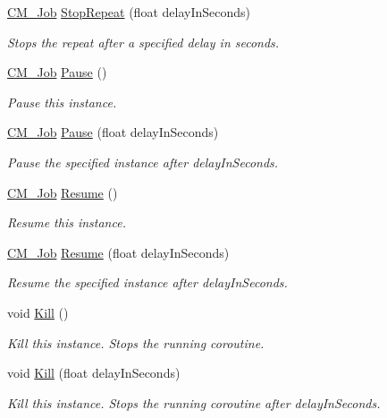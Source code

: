 \begin{DoxyCompactItemize}
\item 
\hyperlink{class_c_m___job}{C\+M\+\_\+\+Job} \hyperlink{class_c_m___job_a5ff8d362cc752f68ceed306837e36b8e}{Stop\+Repeat} (float delay\+In\+Seconds)
\begin{DoxyCompactList}\small\item\em Stops the repeat after a specified delay in seconds. \end{DoxyCompactList}\item 
\hyperlink{class_c_m___job}{C\+M\+\_\+\+Job} \hyperlink{class_c_m___job_aedbae0620e8da4cfc201f0dd3fc70c0e}{Pause} ()
\begin{DoxyCompactList}\small\item\em Pause this instance. \end{DoxyCompactList}\item 
\hyperlink{class_c_m___job}{C\+M\+\_\+\+Job} \hyperlink{class_c_m___job_a3cad9a52d6b2cbd773310f2d16943180}{Pause} (float delay\+In\+Seconds)
\begin{DoxyCompactList}\small\item\em Pause the specified instance after delay\+In\+Seconds. \end{DoxyCompactList}\item 
\hyperlink{class_c_m___job}{C\+M\+\_\+\+Job} \hyperlink{class_c_m___job_a17e7b235cb28ed51729f9235de1b576b}{Resume} ()
\begin{DoxyCompactList}\small\item\em Resume this instance. \end{DoxyCompactList}\item 
\hyperlink{class_c_m___job}{C\+M\+\_\+\+Job} \hyperlink{class_c_m___job_a5c68291f23790ca6be0941d4500ba3eb}{Resume} (float delay\+In\+Seconds)
\begin{DoxyCompactList}\small\item\em Resume the specified instance after delay\+In\+Seconds. \end{DoxyCompactList}\item 
void \hyperlink{class_c_m___job_a436839505339e2eb42c84de560a0874a}{Kill} ()
\begin{DoxyCompactList}\small\item\em Kill this instance. Stops the running coroutine. \end{DoxyCompactList}\item 
void \hyperlink{class_c_m___job_ac6413a58435cac4840e1dad8b53bd306}{Kill} (float delay\+In\+Seconds)
\begin{DoxyCompactList}\small\item\em Kill this instance. Stops the running coroutine after delay\+In\+Seconds. \end{DoxyCompactList}\item 

\end{DoxyCompactItemize}
